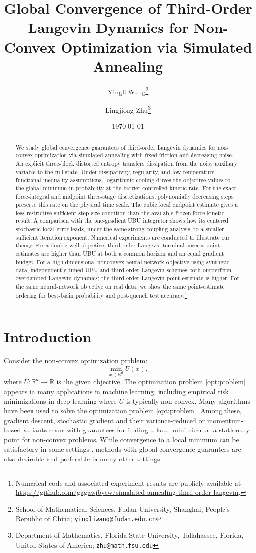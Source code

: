\documentclass[11pt]{article}
\title{Global Convergence of Third-Order Langevin Dynamics for Non-Convex Optimization via Simulated Annealing}
\author{
Yingli Wang\thanks{School of Mathematical Sciences, Fudan University, Shanghai, People's Republic of China; \texttt{yingliwang@fudan.edu.cn}}
\and
Lingjiong Zhu\thanks{Department of Mathematics, Florida State University, Tallahassee, Florida, United States of America; \texttt{zhu@math.fsu.edu}}}
\date{\today}
\theoremstyle{definition}
\begin{document}
\maketitle

\begin{abstract}
We study global convergence guarantees 
of third-order Langevin dynamics for non-convex optimization via simulated annealing
with fixed friction and decreasing noise.  An explicit three-block distorted entropy
transfers dissipation from the noisy auxiliary variable to the full state.
Under dissipativity, regularity, and low-temperature functional-inequality
assumptions, logarithmic cooling drives the objective values to the global
minimum in probability at the barrier-controlled kinetic rate.  For the
exact-force-integral and midpoint three-stage discretizations, polynomially
decreasing steps preserve this rate on the physical time scale.  The cubic
local endpoint estimate gives a less restrictive sufficient step-size condition
than the available frozen-force kinetic result.  A comparison with the
one-gradient UBU integrator shows how its centered stochastic local error leads,
under the same strong-coupling analysis, to a smaller sufficient iteration
exponent. Numerical experiments
are conducted to illustrate our theory. For a double well objective, third-order Langevin terminal-success point
estimates are higher than UBU at both a common horizon and an equal gradient
budget. For a high-dimensional nonconvex neural-network objective using synthetic data,
independently tuned UBU and third-order Langevin schemes both outperform overdamped
Langevin dynamics; the third-order Langevin point estimate is higher.  
For the same neural-network objective on real data, we show the same point-estimate
ordering for best-basin probability and post-quench test accuracy.\footnote{Numerical
code and associated experiment results are publicly available at
\url{https://github.com/gagawjbytw/simulated-annealing-third-order-langevin}.}
\end{abstract}

\section{Introduction}
Consider the non-convex optimization problem:
\begin{equation}\label{opt:problem}
\min_{x\in\mathbb{R}^{d}}U(x),
\end{equation}
where $U:\mathbb{R}^{d}\rightarrow\mathbb{R}$ is the given objective. 
The optimization problem \eqref{opt:problem} appears
in many applications in machine learning, including
empirical risk minimizations in deep learning where $U$ is typically non-convex.
Many algorithms have been used to solve the optimization problem \eqref{opt:problem}. 
Among these, gradient descent, stochastic gradient and their variance-reduced or momentum-based variants come with guarantees for finding a local minimizer or a stationary point for non-convex problems. 
While convergence to a local minimum can be satisfactory in some settings 
\cite{ge2017learning,du2017gradient}, 
methods with global convergence guarantees are also desirable and preferable in many other settings \cite{hazan2016graduated,simsekli-async-MCMC-18}.
\end{document}
